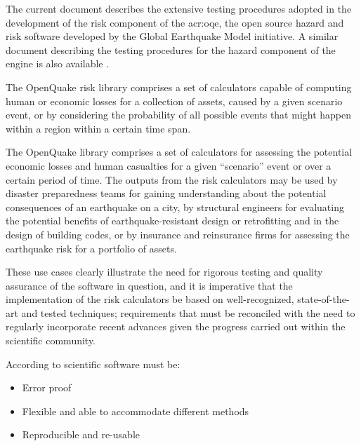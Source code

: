 The current document describes the extensive testing procedures adopted in the development of the risk component of the \gls{acr:oqe}, the open source hazard and risk software developed by the Global Earthquake Model initiative. A similar document describing the testing procedures for the hazard component of the engine is also available \citep{pagani2014_oqtesting}.

The OpenQuake risk library comprises a set of calculators capable of computing human or economic losses for a collection of assets, caused by a given scenario event, or by considering the probability of all possible events that might happen within a region within a certain time span.

The OpenQuake library comprises a set of calculators for assessing the potential economic losses and human casualties for a given ``scenario'' event or over a certain period of time. The outputs from the risk calculators may be used by disaster preparedness teams for gaining understanding about the potential consequences of an earthquake on a city, by structural engineers for evaluating the potential benefits of earthquake-resistant design or retrofitting and in the design of building codes, or by insurance and reinsurance firms for assessing the earthquake risk for a portfolio of assets.

These use cases clearly illustrate the need for rigorous testing and quality assurance of the software in question, and it is imperative that the implementation of the risk calculators be based on well-recognized, state-of-the-art and tested techniques; requirements that must be reconciled with the need to regularly incorporate recent advances given the progress carried out within the scientific community.

According to \citet{berkes2012} scientific software must be:
\begin{itemize}
\item Error proof
\item Flexible and able to accommodate different methods
\item Reproducible and re-usable
\end{itemize}


